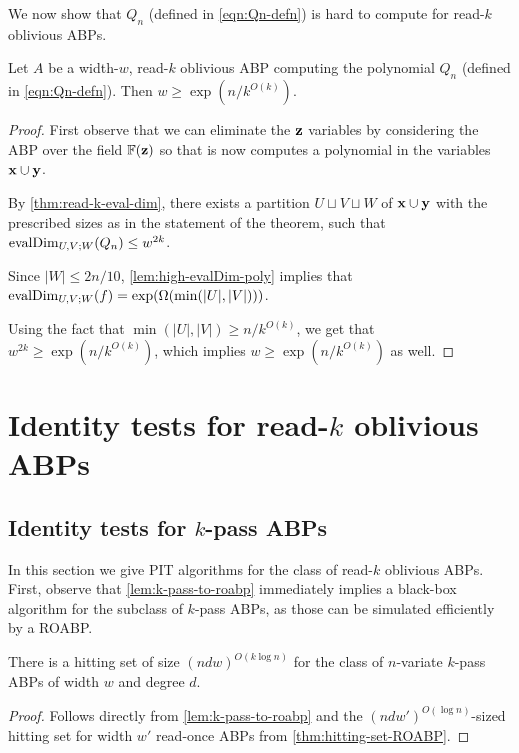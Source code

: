 \documentclass[11pt]{article}
\begin{document}
We now show that $Q_n$ (defined in \eqref{eqn:Qn-defn}) is hard to compute for read-$k$ oblivious ABPs.

\begin{theorem}
\label{thm:poly-hard-for-read-k}
Let $A$ be a width-$w$, read-$k$ oblivious ABP computing the polynomial $Q_n$ (defined in \eqref{eqn:Qn-defn}). Then $w \ge \exp(n/k^{O(k)})$. 
\end{theorem}
\begin{proof}
First observe that we can eliminate the $\mathbf{z}$ variables by considering the ABP over the field $\F(\vecz)$
so that is now computes 
a polynomial in the variables $\mathbf{x} \cup \mathbf{y}$.

By \autoref{thm:read-k-eval-dim}, there exists a partition $U \sqcup V \sqcup W$ of $\mathbf{x} \cup \mathbf{y}$ with the prescribed sizes as in the statement of the theorem, such that $\operatorname{evalDim}_{U,V;W}(Q_n) \leq w^{2k}$.

Since $|W| \le 2n/10$, \autoref{lem:high-evalDim-poly} implies that 
$\operatorname{evalDim}_{U,V;W}(f) = \exp(\Omega(\min(|U|,|V|)))$.

Using the fact that $\min(|U|, |V|) \geq n/k^{O(k)}$, we get that $w^{2k} \ge \exp(n/k^{O(k)})$, which implies $w \ge \exp(n/k^{O(k)})$ as well.
\end{proof}





\section{Identity tests for read-$k$ oblivious ABPs}
\label{sec:pit-read-k-abp}

\subsection{Identity tests for $k$-pass ABPs}

In this section we give PIT algorithms for the class of read-$k$ oblivious ABPs. First, observe that  \autoref{lem:k-pass-to-roabp} immediately implies a black-box algorithm for the subclass of $k$-pass ABPs, as those can be simulated efficiently by a ROABP.

\begin{corollary}\label{cor:k-pass-hittingset}
There is a hitting set of size $(ndw)^{O(k \log n)}$ for the class of $n$-variate $k$-pass ABPs of width $w$ and degree $d$. 
\end{corollary}
\begin{proof}
Follows directly from \autoref{lem:k-pass-to-roabp} and the $(ndw')^{O(\log n)}$-sized hitting set for width $w'$ read-once ABPs from \autoref{thm:hitting-set-ROABP}.
\end{proof}
\end{document}
